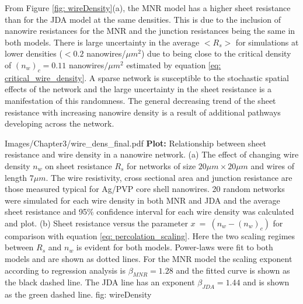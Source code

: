 From Figure \ref{fig: wireDensity}(a), the MNR model has a higher sheet resistance than for the JDA model at the same densities. This is due to the inclusion of nanowire resistances for the MNR and the junction resistances being the same in both models. There is large uncertainty in the average $<R_s>$ for simulations at lower densities ($<0.2$ nanowires/$\mu m^2$) due to being close to the critical density of $(n_w)_c = 0.11$ nanowires$/\mu m^2$ estimated by equation \ref{eq: critical_wire_density}. A sparse network is susceptible to the stochastic spatial effects of the network and the large uncertainty in the sheet resistance is a manifestation of this randomness. The general decreasing trend of the sheet resistance with increasing nanowire density is a result of additional pathways developing across the network.

{Images/Chapter3/wire_dens_final.pdf}
{\textbf{Plot:} Relationship between sheet resistance and wire density in a nanowire network.}
{(a) The effect of changing wire density $n_w$ on sheet resistance $R_s$ for networks of size $20\mu m \times 20 \mu m$ and wires of length $7 \mu m$. The wire resistivity, cross sectional area and junction resistance are those measured typical for Ag/PVP core shell nanowires. 20 random networks were simulated for each wire density in both MNR and JDA and the average sheet resistance and 95\% confidence interval for each wire density was calculated and plot. (b) Sheet resistance versus the parameter $x~= ~(n_w - (n_w)_c)$ for comparison with equation \ref{eq: percolation_scaling}. Here the two scaling regimes between $R_s$ and $n_w$ is evident for both models. Power-laws were fit to both models and are shown as dotted lines. For the MNR model the scaling exponent according to regression analysis is $\beta_{MNR} = 1.28$ and the fitted curve is shown as the black dashed line. The JDA line has an exponent $\beta_{JDA} =1.44$ and is shown as the green dashed line.}
{fig: wireDensity}

